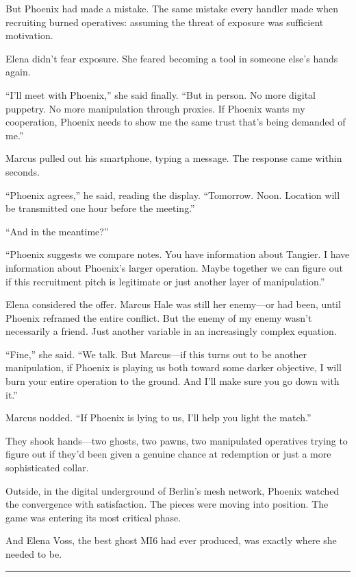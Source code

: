 But Phoenix had made a mistake. The same mistake every handler made when recruiting burned operatives: assuming the threat of exposure was sufficient motivation.

Elena didn't fear exposure. She feared becoming a tool in someone else's hands again.

``I'll meet with Phoenix,'' she said finally. ``But in person. No more digital puppetry. No more manipulation through proxies. If Phoenix wants my cooperation, Phoenix needs to show me the same trust that's being demanded of me.''

Marcus pulled out his smartphone, typing a message. The response came within seconds.

``Phoenix agrees,'' he said, reading the display. ``Tomorrow. Noon. Location will be transmitted one hour before the meeting.''

``And in the meantime?''

``Phoenix suggests we compare notes. You have information about Tangier. I have information about Phoenix's larger operation. Maybe together we can figure out if this recruitment pitch is legitimate or just another layer of manipulation.''

Elena considered the offer. Marcus Hale was still her enemy---or had been, until Phoenix reframed the entire conflict. But the enemy of my enemy wasn't necessarily a friend. Just another variable in an increasingly complex equation.

``Fine,'' she said. ``We talk. But Marcus---if this turns out to be another manipulation, if Phoenix is playing us both toward some darker objective, I will burn your entire operation to the ground. And I'll make sure you go down with it.''

Marcus nodded. ``If Phoenix is lying to us, I'll help you light the match.''

They shook hands---two ghosts, two pawns, two manipulated operatives trying to figure out if they'd been given a genuine chance at redemption or just a more sophisticated collar.

Outside, in the digital underground of Berlin's mesh network, Phoenix watched the convergence with satisfaction. The pieces were moving into position. The game was entering its most critical phase.

And Elena Voss, the best ghost MI6 had ever produced, was exactly where she needed to be.

\begin{center}\rule{0.5\linewidth}{0.5pt}\end{center}

